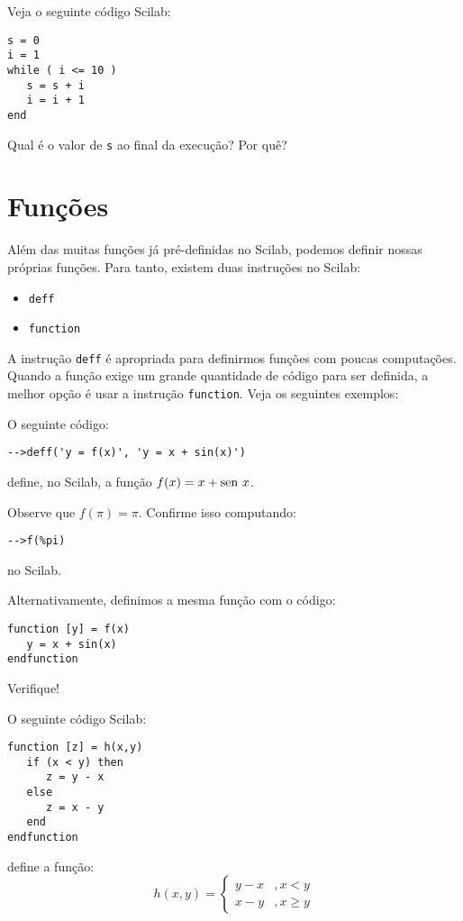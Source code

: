 \begin{ex}
Veja o seguinte código Scilab:
\begin{verbatim}
s = 0
i = 1
while ( i <= 10 )
   s = s + i
   i = i + 1
end
\end{verbatim}
Qual é o valor de \verb+s+ ao final da execução? Por quê?
\end{ex}

\section{Funções}

Além das muitas funções já pré-definidas no Scilab, podemos definir nossas próprias funções. Para tanto, existem duas instruções no Scilab:
\begin{itemize}
\item \verb+deff+
\item \verb+function+
\end{itemize}

A instrução \verb+deff+ é apropriada para definirmos funções com poucas computações. Quando a função exige um grande quantidade de código para ser definida, a melhor opção é usar a instrução \verb+function+. Veja os seguintes exemplos:

\begin{ex}
  O seguinte código:
\begin{verbatim}
-->deff('y = f(x)', 'y = x + sin(x)')
\end{verbatim}
define, no Scilab, a função $f(x) = x + \operatorname{sen}\, x$.

Observe que $f(\pi) = \pi$. Confirme isso computando:
\begin{verbatim}
-->f(%pi)
\end{verbatim}
no Scilab.

Alternativamente, definimos a mesma função com o código:
\begin{verbatim}
function [y] = f(x)
   y = x + sin(x)
endfunction
\end{verbatim}
Verifique!
\end{ex}

\begin{ex}
  O seguinte código Scilab:
\begin{verbatim}
function [z] = h(x,y)
   if (x < y) then
      z = y - x
   else
      z = x - y
   end
endfunction
\end{verbatim}
define a função:
\begin{equation*}
  h(x,y) = \left\{
    \begin{array}{ll}
      y - x &, x < y\\
      x - y &, x \geq y
    \end{array}
\right.
\end{equation*}
\end{ex}


